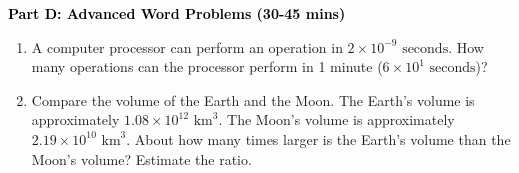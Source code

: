 \documentclass[12pt, letterpaper, fleqn]{article}
\begin{document}
\newpage

\begin{tcolorbox}[colback=customteal!20]
\large\textcolor{black}{\textbf{Part D: Advanced Word Problems (30-45 mins)}}
\end{tcolorbox}

\vspace{3mm}

\begin{enumerate}[itemsep=5.5cm, leftmargin=0.6cm, resume]
\item A computer processor can perform an operation in $2 \times 10^{-9}\text{ seconds}$. How many operations can the processor perform in 1 minute ($6 \times 10^1\text{ seconds}$)?
\item Compare the volume of the Earth and the Moon. The Earth's volume is approximately $1.08 \times 10^{12}\text{ km}^3$. The Moon's volume is approximately $2.19 \times 10^{10}\text{ km}^3$. About how many times larger is the Earth's volume than the Moon's volume? Estimate the ratio.
\end{enumerate}
\end{document}
